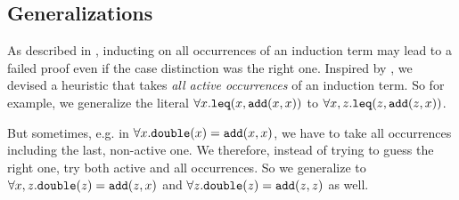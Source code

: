 \subsection{Generalizations}
As described in \cite{vampiregeneralization}, inducting on all occurrences of an induction term may lead to a failed proof even if the case distinction was the right one. Inspired by \cite{cruanes}, we devised a heuristic that takes \textit{all active occurrences} of an induction term. So for example, we generalize the literal $\forall x.\mathtt{leq}(x,\mathtt{add}(x,x))$ to $\forall x,z.\mathtt{leq}(z,\mathtt{add}(z,x))$.

But sometimes, e.g. in $\forall x.\mathtt{double}(x) = \mathtt{add}(x,x)$, we have to take all occurrences including the last, non-active one. We therefore, instead of trying to guess the right one, try both active and all occurrences. So we generalize to $\forall x,z.\mathtt{double}(z) = \mathtt{add}(z,x)$ and $\forall z.\mathtt{double}(z) = \mathtt{add}(z,z)$ as well.

